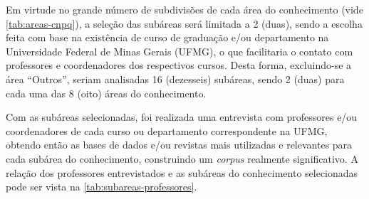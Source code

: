 Em virtude no grande número de subdivisões de cada área do conhecimento (vide \autoref{tab:areas-cnpq}), a seleção das subáreas será limitada a 2 (duas), sendo a escolha feita com base na existência de curso de graduação e/ou departamento na Universidade Federal de Minas Gerais (UFMG), o que facilitaria o contato com professores e coordenadores dos respectivos cursos. Desta forma, excluindo-se a área ``Outros'', seriam analisadas 16 (dezesseis) subáreas, sendo 2 (duas) para cada uma das 8 (oito) áreas do conhecimento.

Com as subáreas selecionadas, foi realizada uma entrevista com professores e/ou coordenadores de cada curso ou departamento correspondente na UFMG, obtendo então as bases de dados e/ou revistas mais utilizadas e relevantes para cada subárea do conhecimento, construindo um \emph{corpus} realmente significativo. A relação dos professores entrevistados e as subáreas do conhecimento selecionadas pode ser vista na \autoref{tab:subareas-professores}.

